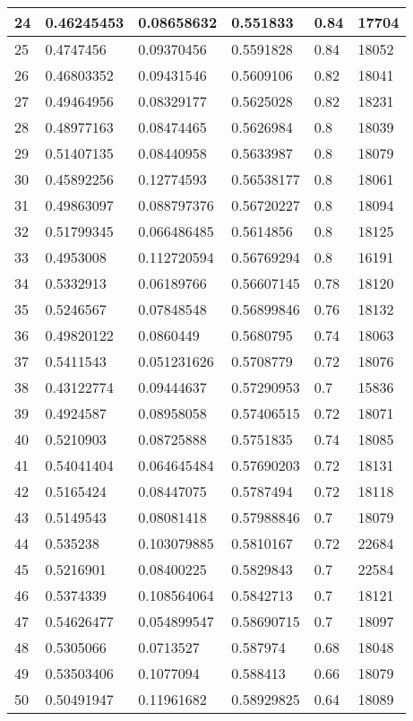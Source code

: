 \begin{longtable}{|l|l|l|l|l|l|}
24 & 0.46245453 & 0.08658632 & 0.551833 & 0.84 & 17704 \\ \hline 
25 & 0.4747456 & 0.09370456 & 0.5591828 & 0.84 & 18052 \\ \hline 
26 & 0.46803352 & 0.09431546 & 0.5609106 & 0.82 & 18041 \\ \hline 
27 & 0.49464956 & 0.08329177 & 0.5625028 & 0.82 & 18231 \\ \hline 
28 & 0.48977163 & 0.08474465 & 0.5626984 & 0.8 & 18039 \\ \hline 
29 & 0.51407135 & 0.08440958 & 0.5633987 & 0.8 & 18079 \\ \hline 
30 & 0.45892256 & 0.12774593 & 0.56538177 & 0.8 & 18061 \\ \hline 
31 & 0.49863097 & 0.088797376 & 0.56720227 & 0.8 & 18094 \\ \hline 
32 & 0.51799345 & 0.066486485 & 0.5614856 & 0.8 & 18125 \\ \hline 
33 & 0.4953008 & 0.112720594 & 0.56769294 & 0.8 & 16191 \\ \hline 
34 & 0.5332913 & 0.06189766 & 0.56607145 & 0.78 & 18120 \\ \hline 
35 & 0.5246567 & 0.07848548 & 0.56899846 & 0.76 & 18132 \\ \hline 
36 & 0.49820122 & 0.0860449 & 0.5680795 & 0.74 & 18063 \\ \hline 
37 & 0.5411543 & 0.051231626 & 0.5708779 & 0.72 & 18076 \\ \hline 
38 & 0.43122774 & 0.09444637 & 0.57290953 & 0.7 & 15836 \\ \hline 
39 & 0.4924587 & 0.08958058 & 0.57406515 & 0.72 & 18071 \\ \hline 
40 & 0.5210903 & 0.08725888 & 0.5751835 & 0.74 & 18085 \\ \hline 
41 & 0.54041404 & 0.064645484 & 0.57690203 & 0.72 & 18131 \\ \hline 
42 & 0.5165424 & 0.08447075 & 0.5787494 & 0.72 & 18118 \\ \hline 
43 & 0.5149543 & 0.08081418 & 0.57988846 & 0.7 & 18079 \\ \hline 
44 & 0.535238 & 0.103079885 & 0.5810167 & 0.72 & 22684 \\ \hline 
45 & 0.5216901 & 0.08400225 & 0.5829843 & 0.7 & 22584 \\ \hline 
46 & 0.5374339 & 0.108564064 & 0.5842713 & 0.7 & 18121 \\ \hline 
47 & 0.54626477 & 0.054899547 & 0.58690715 & 0.7 & 18097 \\ \hline 
48 & 0.5305066 & 0.0713527 & 0.587974 & 0.68 & 18048 \\ \hline 
49 & 0.53503406 & 0.1077094 & 0.588413 & 0.66 & 18079 \\ \hline 
50 & 0.50491947 & 0.11961682 & 0.58929825 & 0.64 & 18089 \\ \hline 
\end{longtable}
